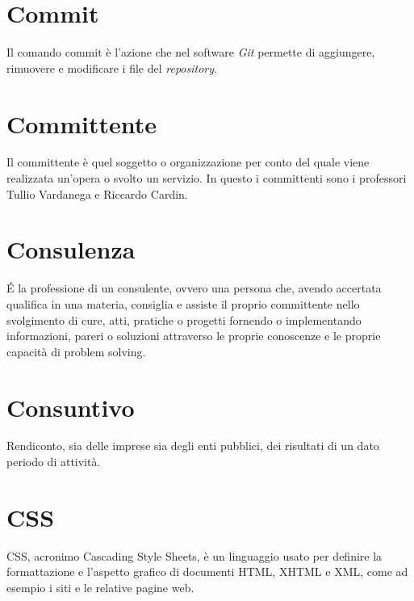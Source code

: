 \section{Commit}\label{sec:Commits}
Il comando commit è l'azione che nel software \emph{Git} permette di aggiungere, rimuovere e modificare i file del \emph{repository}.

\section{Committente}\label{sec:Committenti}
Il committente è quel soggetto o organizzazione per conto del quale viene realizzata un'opera o svolto un servizio. In questo  i committenti sono i professori Tullio Vardanega e Riccardo Cardin.

\section{Consulenza}\label{sec:Consulenze}
É la professione di un consulente, ovvero una persona che, avendo accertata qualifica in una materia, consiglia e assiste il proprio committente nello svolgimento di cure, atti, pratiche o progetti fornendo o implementando informazioni, pareri o soluzioni attraverso le proprie conoscenze e le proprie capacità di problem solving.

\section{Consuntivo}\label{sec:Consuntivi}
Rendiconto, sia delle imprese sia degli enti pubblici, dei risultati di un dato periodo di attività.

\section{CSS}\label{sec:Cascading Style Sheets}
CSS, acronimo Cascading Style Sheets, è un linguaggio usato per definire la formattazione e l'aspetto grafico di documenti HTML, XHTML e XML, come ad esempio i siti e le relative pagine web.
